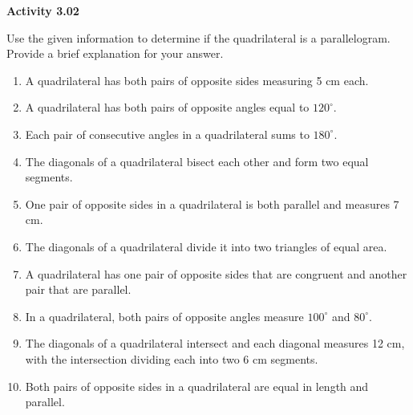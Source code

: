 \vspace{0.3ex}
\noindent\textbf{Activity 3.02}

\vspace{0.2ex}

\noindent Use the given information to determine if the quadrilateral is a parallelogram. Provide a brief explanation for your answer.

\begin{enumerate}[label=\color{blue}\arabic*.]
    \item A quadrilateral has both pairs of opposite sides measuring 5 cm each.
    \item A quadrilateral has both pairs of opposite angles equal to \(120^\circ\).
    \item Each pair of consecutive angles in a quadrilateral sums to \(180^\circ\).
    \item The diagonals of a quadrilateral bisect each other and form two equal segments.
    \item One pair of opposite sides in a quadrilateral is both parallel and measures 7 cm.
    \item The diagonals of a quadrilateral divide it into two triangles of equal area.
    \item A quadrilateral has one pair of opposite sides that are congruent and another pair that are parallel.
    \item In a quadrilateral, both pairs of opposite angles measure \(100^\circ\) and \(80^\circ\).
    \item The diagonals of a quadrilateral intersect and each diagonal measures 12 cm, with the intersection dividing each into two 6 cm segments.
    \item Both pairs of opposite sides in a quadrilateral are equal in length and parallel.
\end{enumerate}
